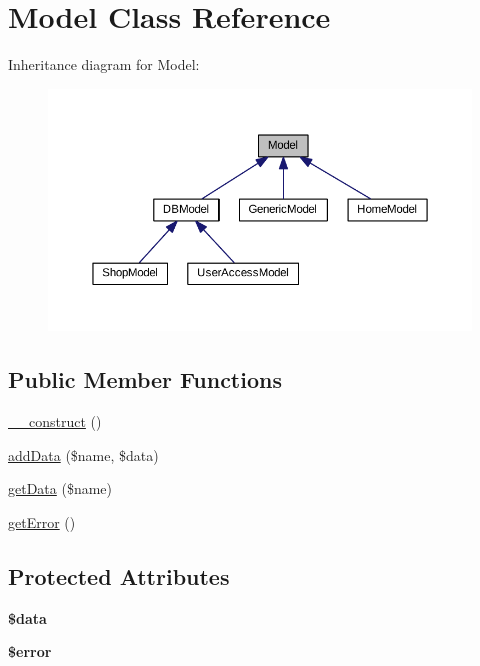 \hypertarget{classModel}{\section{Model Class Reference}
\label{classModel}
}


Inheritance diagram for Model\+:\nopagebreak
\begin{figure}[H]
\begin{center}
\leavevmode
\includegraphics[width=350pt]{classModel__inherit__graph}
\end{center}
\end{figure}
\subsection*{Public Member Functions}
\begin{DoxyCompactItemize}
\item 
\hyperlink{classModel_a655d64396144aad24a62132fa11b92ea}{\+\_\+\+\_\+construct} ()
\item 
\hyperlink{classModel_af422ec4a1428678240da4e751f942b9c}{add\+Data} (\$name, \$data)
\item 
\hyperlink{classModel_a8e1cba2731a082294561ce1b499f3402}{get\+Data} (\$name)
\item 
\hyperlink{classModel_a0372eec1043cef6e9b6a50220cb0b031}{get\+Error} ()
\end{DoxyCompactItemize}
\subsection*{Protected Attributes}
\begin{DoxyCompactItemize}
\item 
\hypertarget{classModel_ae04c729239482d90601ba5c9d6a4fc66}{{\bfseries \$data}}\label{classModel_ae04c729239482d90601ba5c9d6a4fc66}

\item 
\hypertarget{classModel_a4c02091587027b71fed8b3ff0a96748b}{{\bfseries \$error}}\label{classModel_a4c02091587027b71fed8b3ff0a96748b}

\end{DoxyCompactItemize}



